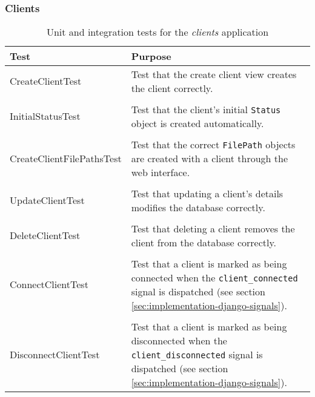 \ \\[2cm]

\subsubsection{Clients}

\begin{table}[H]
    \centering
    \begin{tabular}{ l  p{7cm} }
        \toprule
        Test                        & Purpose
        \\ \midrule
        CreateClientTest            & Test that the create client view creates
                                      the client correctly.
        \\ \\
        InitialStatusTest           & Test that the client's initial
                                      \verb!Status! object is created
                                      automatically.
        \\ \\
        CreateClientFilePathsTest   & Test that the correct \verb!FilePath!
                                      objects are created with a client
                                      through the web interface.
        \\ \\
        UpdateClientTest            & Test that updating a client's details
                                      modifies the database correctly.
        \\ \\
        DeleteClientTest            & Test that deleting a client removes the
                                      client from the database correctly.

        \\ \\
        ConnectClientTest           & Test that a client is marked as being
                                      connected when the
                                      \verb!client_connected! signal is
                                      dispatched (see section
                                      \ref{sec:implementation-django-signals}).
        \\ \\
        DisconnectClientTest        & Test that a client is marked as being
                                      disconnected when the
                                      \verb!client_disconnected! signal is
                                      dispatched (see section
                                      \ref{sec:implementation-django-signals}).
        \\ \bottomrule
    \end{tabular}
    \caption{Unit and integration tests for the \emph{clients} application}
    \label{tab:tests-clients}
\end{table}

